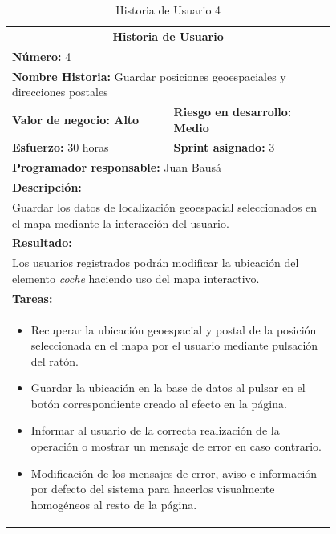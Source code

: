 	\begin{table}[H]
	  \centering 
	 	\begin{tabular}{p{0.4\linewidth}p{0.4\linewidth}}
	    \toprule
	    \multicolumn{2}{c}{\cellcolor{black!30}\textbf{Historia de Usuario}} 													\\
		\multicolumn{2}{l}{\cellcolor{gray!25}\textbf{Número: }4}																\\
		\multicolumn{2}{l}{\textbf{Nombre Historia: } Guardar posiciones geoespaciales y direcciones postales}				\\
		\cellcolor{gray!25}\textbf{Valor de negocio: Alto}	&	\cellcolor{gray!25}\textbf{Riesgo en desarrollo: Medio}		\\
		\textbf{Esfuerzo:} 30 horas				&	\textbf{Sprint asignado: }3 												\\
		\multicolumn{2}{l}{\cellcolor{gray!25}\textbf{Programador responsable: }Juan Bausá}									\\
		\multicolumn{2}{l}{\textbf{Descripción:}}                                                     						\\
		\multicolumn{2}{l}{\parbox{15cm}{Guardar los datos de localización geoespacial seleccionados en el mapa mediante la interacción del usuario.}}				\\
		\multicolumn{2}{l}{\cellcolor{gray!25}\textbf{Resultado:}}																\\		
		\multicolumn{2}{l}{\parbox{15cm}{Los usuarios registrados podrán modificar la ubicación del elemento \textit{coche} haciendo uso del mapa interactivo.}}																									\\
		\multicolumn{2}{l}{\textbf{Tareas:}}																					\\
		\multicolumn{2}{l}{
			\begin{minipage}{12cm}
	    		\vskip 4pt
	    		\begin{itemize}
	    			\item Recuperar la ubicación geoespacial y postal de la posición seleccionada en el mapa por el usuario mediante pulsación del ratón.
	    			\item Guardar la ubicación en la base de datos al pulsar en el botón correspondiente creado al efecto en la página.
	    			\item Informar al usuario de la correcta realización de la operación o mostrar un mensaje de error en caso contrario.
	    			\item Modificación de los mensajes de error, aviso e información por defecto del sistema para hacerlos visualmente homogéneos al resto de la página.
				\end{itemize}
			  	\vskip 4pt
		 	\end{minipage}
		} \\																				
	    \hline
	  \end{tabular}
	  \caption{Historia de Usuario 4}
	\end{table}
	
